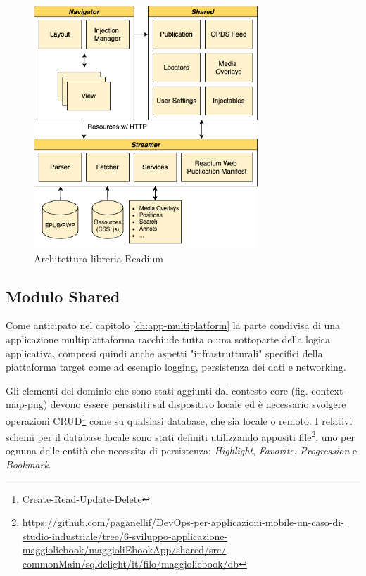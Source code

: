 \begin{figure}[H]
    \centering
    \includegraphics[width=0.75\textwidth]{img/readium-arch.png}
    \caption{Architettura libreria Readium}
    \label{readiumarch}
\end{figure}

\subsection{Modulo Shared}
Come anticipato nel capitolo \ref{ch:app-multiplatform} la parte condivisa di una applicazione multipiattaforma racchiude tutta o una sottoparte della logica applicativa, compresi quindi anche aspetti "infrastrutturali" specifici della piattaforma target come ad esempio logging, persistenza dei dati e networking.

Gli elementi del dominio che sono stati aggiunti dal contesto core (fig. context-map-png) devono essere persistiti sul dispositivo locale ed è necessario svolgere operazioni CRUD\footnote{Create-Read-Update-Delete} come su qualsiasi database, che sia locale o remoto. I relativi schemi per il database locale sono stati definiti utilizzando appositi file\footnote{\href{https://github.com/paganellif/DevOps-per-applicazioni-mobile-un-caso-di-studio-industriale/tree/6-sviluppo-applicazione-maggioliebook/maggioliEbookApp/shared/src/commonMain/sqldelight/it/filo/maggioliebook/db}{https://github.com/paganellif/DevOps-per-applicazioni-mobile-un-caso-di-studio-industriale/tree/6-sviluppo-applicazione-maggioliebook/maggioliEbookApp/shared/src/\\commonMain/sqldelight/it/filo/maggioliebook/db}}, uno per ognuna delle entità che necessita di persistenza: \textit{Highlight}, \textit{Favorite}, \textit{Progression} e \textit{Bookmark}.

